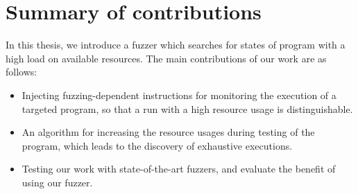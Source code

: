 \section{Summary of contributions}
\label{sec:1.2}

In this thesis, we introduce a fuzzer which searches for states of program with a high load on available resources. The main contributions of our work are as follows:

\begin{itemize}
    \item Injecting fuzzing-dependent instructions for monitoring the execution of a targeted program, so that a run with a high resource usage is distinguishable.
    \item An algorithm for increasing the resource usages during testing of the program, which leads to the discovery of exhaustive executions.
    \item Testing our work with state-of-the-art fuzzers, and evaluate the benefit of using our fuzzer. 
\end{itemize}